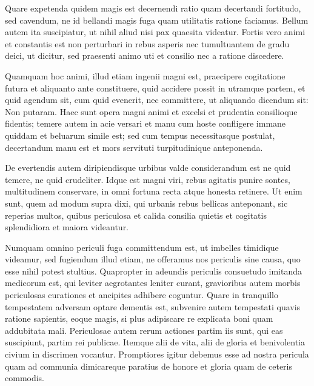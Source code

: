  Quare expetenda quidem magis est decernendi ratio quam decertandi fortitudo, sed cavendum, ne id bellandi magis fuga quam utilitatis ratione faciamus. Bellum autem ita suscipiatur, ut nihil aliud nisi pax quaesita videatur. Fortis vero animi et constantis est non perturbari in rebus asperis nec tumultuantem de gradu deici, ut dicitur, sed praesenti animo uti et consilio nec a ratione discedere.

 Quamquam hoc animi, illud etiam ingenii magni est, praecipere cogitatione futura et aliquanto ante constituere, quid accidere possit in utramque partem, et quid agendum sit, cum quid evenerit, nec committere, ut aliquando dicendum sit: Non putaram. Haec sunt opera magni animi et excelsi et prudentia consilioque fidentis; temere autem in acie versari et manu cum hoste confligere immane quiddam et beluarum simile est; sed cum tempus necessitasque postulat, decertandum manu est et mors servituti turpitudinique anteponenda.

 De evertendis autem diripiendisque urbibus valde considerandum est ne quid temere, ne quid crudeliter. Idque est magni viri, rebus agitatis punire sontes, multitudinem conservare, in omni fortuna recta atque honesta retinere. Ut enim sunt, quem ad modum supra dixi, qui urbanis rebus bellicas anteponant, sic reperias multos, quibus periculosa et calida consilia quietis et cogitatis splendidiora et maiora videantur.

 Numquam omnino periculi fuga committendum est, ut imbelles timidique videamur, sed fugiendum illud etiam, ne offeramus nos periculis sine causa, quo esse nihil potest stultius. Quapropter in adeundis periculis consuetudo imitanda medicorum est, qui leviter aegrotantes leniter curant, gravioribus autem morbis periculosas curationes et ancipites adhibere coguntur. Quare in tranquillo tempestatem adversam optare dementis est, subvenire autem tempestati quavis ratione sapientis, eoque magis, si plus adipiscare re explicata boni quam addubitata mali. Periculosae autem rerum actiones partim iis sunt, qui eas suscipiunt, partim rei publicae. Itemque alii de vita, alii de gloria et benivolentia civium in discrimen vocantur. Promptiores igitur debemus esse ad nostra pericula quam ad communia dimicareque paratius de honore et gloria quam de ceteris commodis.

